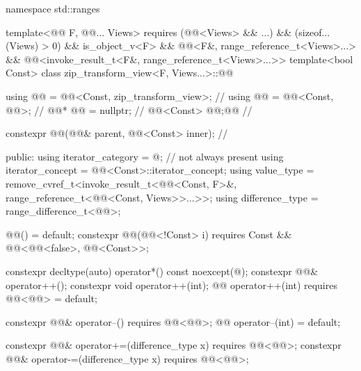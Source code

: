 %
\begin{codeblock}
namespace std::ranges {
  template<@@ F, @@... Views>
    requires (@@<Views> && ...) && (sizeof...(Views) > 0) && is_object_v<F> &&
              @@<F&, range_reference_t<Views>...> &&
              @@<invoke_result_t<F&, range_reference_t<Views>...>>
  template<bool Const>
  class zip_transform_view<F, Views...>::@@ {
    using @@ = @@<Const, zip_transform_view>;      // \expos
    using @@ = @@<Const, @@>;                 // \expos
    @@* @@ = nullptr;                                  // \expos
    @@<Const> @@;@\itcorr[-1]@                                    // \expos

    constexpr @@(@@& parent, @@<Const> inner);   // \expos

  public:
    using iterator_category = @\seebelownc@;                        // not always present
    using iterator_concept  = @@<Const>::iterator_concept;
    using value_type =
      remove_cvref_t<invoke_result_t<@@<Const, F>&,
                                     range_reference_t<@@<Const, Views>>...>>;
    using difference_type = range_difference_t<@@>;

    @@() = default;
    constexpr @@(@@<!Const> i)
      requires Const && @@<@@<false>, @@<Const>>;

    constexpr decltype(auto) operator*() const noexcept(@\seebelow@);
    constexpr @@& operator++();
    constexpr void operator++(int);
    @@ operator++(int) requires @@<@@> = default;

    constexpr @@& operator--() requires @@<@@>;
    @@ operator--(int) = default;

    constexpr @@& operator+=(difference_type x) requires @@<@@>;
    constexpr @@& operator-=(difference_type x) requires @@<@@>;

}}
\end{codeblock}
